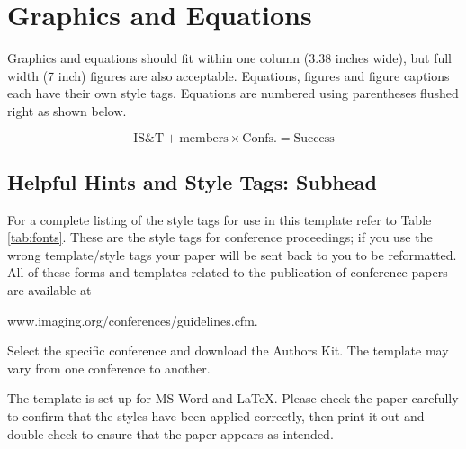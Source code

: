 \documentclass[letterpaper,twocolumn,fleqn]{article}
\begin{document}
\section{Graphics and Equations}
Graphics and equations should fit within one column (3.38 inches
wide), but full width (7 inch) figures are also acceptable. Equations,
figures and figure captions each have their own style tags. Equations
are numbered using parentheses flushed right as shown below.

\begin{equation}
\label{eq:ist}
\textrm{IS\&T} + \textrm{members} \times \textrm{Confs.} = \textrm{Success}
\end{equation}


\subsection{Helpful Hints and Style Tags: Subhead}
For a complete listing of the style tags for use in this template
refer to Table \ref{tab:fonts}. These are the style tags for
conference proceedings; if you use the wrong template/style tags your
paper will be sent back to you to be reformatted.  All of these forms
and templates related to the publication of conference papers are
available at

www.imaging.org/conferences/guidelines.cfm. 

Select the specific conference and download the Authors Kit. The
template may vary from one conference to another.

The template is set up for MS Word and LaTeX. Please check the paper
carefully to confirm that the styles have been applied correctly, then
print it out and double check to ensure that the paper appears as
intended.
\end{document}
